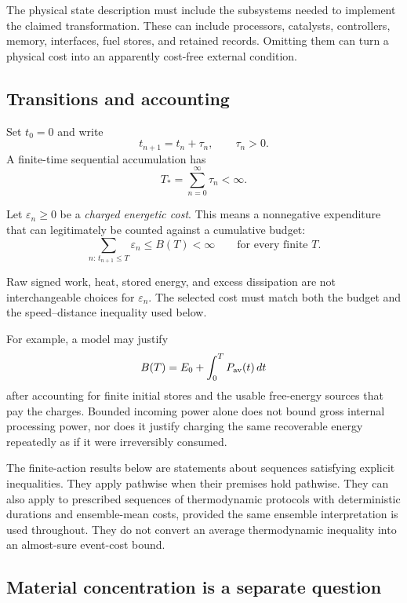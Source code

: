 \documentclass[11pt,a4paper]{article}
\theoremstyle{definition}
\numberwithin{equation}{section}
\begin{document}
The physical state description must include the subsystems needed to
implement the claimed transformation. These can include processors,
catalysts, controllers, memory, interfaces, fuel stores, and retained
records. Omitting them can turn a physical cost into an apparently
cost-free external condition.

\subsection*{Transitions and accounting}

Set $t_0=0$ and write
\[
t_{n+1}=t_n+\tau_n,
\qquad
\tau_n>0.
\]
A finite-time sequential accumulation has
\begin{equation}
T_*=\sum_{n=0}^{\infty}\tau_n<\infty.
\label{eq:time-sum}
\end{equation}

Let $\varepsilon_n\ge0$ be a \emph{charged energetic cost}. This means
a nonnegative expenditure that can legitimately be counted against
a cumulative budget:
\begin{equation}
\sum_{n:\,t_{n+1}\le T}\varepsilon_n
\le B(T)<\infty
\qquad\text{for every finite }T.
\label{eq:budget}
\end{equation}

Raw signed work, heat, stored energy, and excess dissipation are not
interchangeable choices for $\varepsilon_n$. The selected cost must
match both the budget and the speed--distance inequality used below.

For example, a model may justify
\[
B(T)=E_0+\int_0^T P_{\rm av}(t)\,dt
\]
after accounting for finite initial stores and the usable free-energy
sources that pay the charges. Bounded incoming power alone does not
bound gross internal processing power, nor does it justify charging
the same recoverable energy repeatedly as if it were irreversibly
consumed.

The finite-action results below are statements about sequences
satisfying explicit inequalities. They apply pathwise when their
premises hold pathwise. They can also apply to prescribed sequences
of thermodynamic protocols with deterministic durations and
ensemble-mean costs, provided the same ensemble interpretation is
used throughout. They do not convert an average thermodynamic
inequality into an almost-sure event-cost bound.

\subsection*{Material concentration is a separate question}
\end{document}
